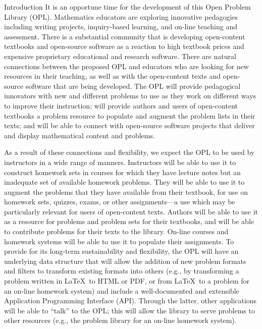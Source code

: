 \documentclass[11pt]{article}
\begin{document}
\begin{section}{Introduction}
It is an opportune time for the development of this Open Problem Library
(OPL).  Mathematics educators are exploring innovative pedagogies
including writing projects, inquiry-based learning, and on-line teaching
and assessment.  There is a substantial community that is developing
open-content textbooks and open-source software as a reaction to high
textbook prices and expensive proprietary educational and research
software.  There are natural connections between the proposed OPL and
educators who are looking for new resources in their teaching, as well as
with the open-content texts and open-source software that are being
developed.  The OPL will provide pedagogical innovators with new and
different problems to use as they work on different ways to improve their
instruction; will provide authors and users of open-content textbooks a
problem resource to populate and augment the problem lists in their texts;
and will be able to connect with open-source software projects that
deliver and display mathematical content and problems.

As a result of these connections and flexibility, we expect the OPL to be
used by instructors in a wide range of manners.  Instructors will be able
to use it to construct homework sets in courses for which they have
lecture notes but an inadequate set of available homework problems.  They
will be able to use it to augment the problems that they have available
from their textbook, for use on homework sets, quizzes, exams, or other
assignments---a use which may be particularly relevant for users of
open-content texts.  Authors will be able to use it as a resource for
problems and problem sets for their textbooks, and will be able to
contribute problems for their texts to the library.  On-line courses and
homework systems will be able to use it to populate their assignments.  To
provide for its long-term sustainability and flexibility, the OPL will
have an underlying data structure that will allow the addition of new
problem formats and filters to transform existing formats into others
(e.g., by transforming a problem written in \LaTeX\ to HTML or PDF, or
from \LaTeX\ to a problem for an on-line homework system) and include a
well-documented and extensible Application Programming Interface
(API). Through the latter, other applications will be able to ``talk'' to
the OPL; this will allow the library to serve problems to other resources
(e.g., the problem library for an on-line homework system).

\end{section}
\end{document}
